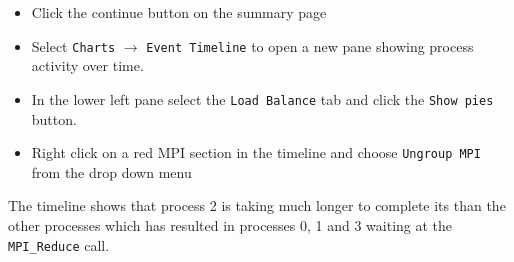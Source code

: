 \documentclass[a4paper,titlepage]{article}
\begin{document}
\begin{itemize}
\item Click the continue button on the summary page
\item Select \texttt{Charts} $\rightarrow$ \texttt{Event Timeline} to open a new pane showing process activity over time.
\item In the lower left pane select the \texttt{Load Balance} tab and click the \texttt{Show pies} button. 
\item Right click on a red MPI section in the timeline and choose \texttt{Ungroup MPI} from the drop down menu
\end{itemize}
The timeline shows that process 2 is taking much longer to complete its than the other processes which has resulted in processes 0, 1 and 3 waiting at the \verb+MPI_Reduce+ call.
\end{document}
